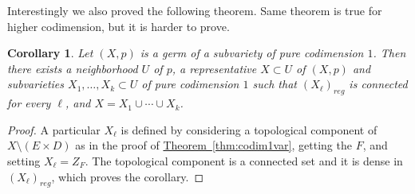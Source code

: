 \documentclass[12pt,openany]{book}
\theoremstyle{plain}
\newtheorem{cor}[thm]{Corollary}
\theoremstyle{remark}
\theoremstyle{definition}
\theoremstyle{exercise}
\theoremstyle{example}
\newcommand{\thmref}[1]{\hyperref[#1]{Theorem~\ref*{#1}}}
\begin{document}
Interestingly we also proved the following theorem.  Same theorem is true
for higher codimension, but it is harder to prove.

\begin{cor}
Let $(X,p)$ is a germ of a subvariety of pure codimension $1$.  Then there exists
a neighborhood $U$ of $p$, a representative $X \subset U$ of $(X,p)$
and subvarieties $X_1,\ldots,X_k \subset U$
of pure codimension $1$ such that $(X_\ell)_{\mathit{reg}}$ is connected for
every $\ell$, and
$X = X_1 \cup \cdots \cup X_k$.
\end{cor}

\begin{proof}
A particular $X_\ell$ is defined by considering a topological component of $X \setminus
(E \times D)$ as in the proof of \thmref{thm:codim1var}, getting the $F$,
and setting $X_\ell = Z_F$.
The topological component is a connected set and it is dense in
$(X_\ell)_{\mathit{reg}}$, which proves the corollary.
\end{proof}
\end{document}
